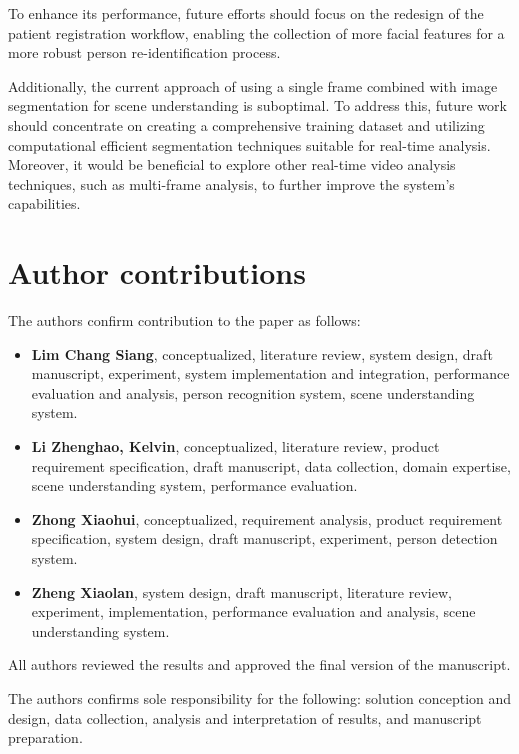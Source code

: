 \documentclass{article}
\begin{document}
To enhance its performance, future efforts should focus on the redesign of the patient registration workflow, enabling the collection of more facial features for a more robust person re-identification process. 

Additionally, the current approach of using a single frame combined with image segmentation for scene understanding is suboptimal. To address this, future work should concentrate on creating a comprehensive training dataset and utilizing computational efficient segmentation techniques suitable for real-time analysis. Moreover, it would be beneficial to explore other real-time video analysis techniques, such as multi-frame analysis, to further improve the system's capabilities.

\section{Author contributions}
The authors confirm contribution to the paper as follows:
\begin{itemize}
\item \textbf{Lim Chang Siang}, conceptualized, literature review, system design, draft manuscript, experiment, system implementation and integration, performance evaluation and analysis, person recognition system, scene understanding system.
\item \textbf{Li Zhenghao, Kelvin}, conceptualized, literature review, product requirement specification, draft manuscript, data collection, domain expertise, scene understanding system, performance evaluation.
\item \textbf{Zhong Xiaohui}, conceptualized, requirement analysis, product requirement specification, system design, draft manuscript, experiment, person detection system.
\item \textbf{Zheng Xiaolan}, system design, draft manuscript, literature review, experiment, implementation, performance evaluation and analysis, scene understanding system.
\end{itemize}

All authors reviewed the results and approved the final version of the manuscript. 

The authors confirms sole responsibility for the following: solution conception and design, data collection, analysis and interpretation of results, and manuscript preparation.



\end{document}

